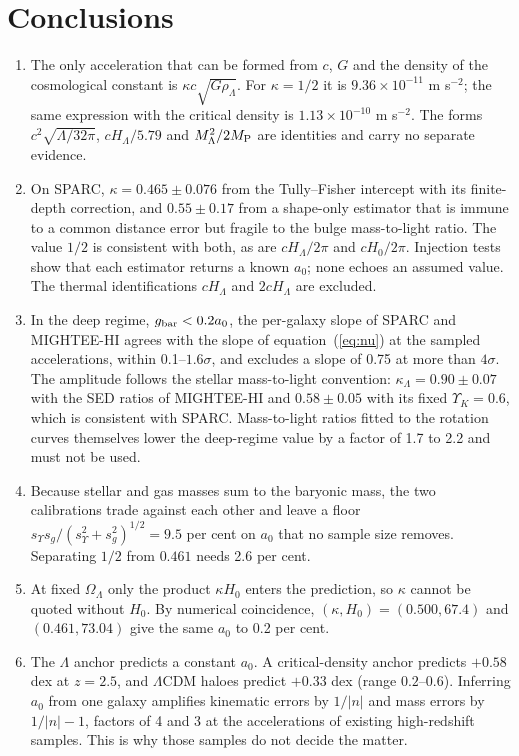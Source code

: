 \documentclass[fleqn,usenatbib]{mnras}
\begin{document}
\section{Conclusions}
\label{sec:conc}
\begin{enumerate}
\item The only acceleration that can be formed from $c$, $G$ and the density of the cosmological constant is $\kappa c\sqrt{G\rho_\Lambda}$. For $\kappa=1/2$ it is $9.36\times10^{-11}$ m s$^{-2}$; the same expression with the critical density is $1.13\times10^{-10}$ m s$^{-2}$. The forms $c^2\sqrt{\Lambda/32\pi}$, $cH_\Lambda/5.79$ and $M_\Lambda^2/2M_{\rm P}$ are identities and carry no separate evidence.
\item On SPARC, $\kappa=0.465\pm0.076$ from the Tully--Fisher intercept with its finite-depth correction, and $0.55\pm0.17$ from a shape-only estimator that is immune to a common distance error but fragile to the bulge mass-to-light ratio. The value $1/2$ is consistent with both, as are $cH_\Lambda/2\pi$ and $cH_0/2\pi$. Injection tests show that each estimator returns a known $a_0$; none echoes an assumed value. The thermal identifications $cH_\Lambda$ and $2cH_\Lambda$ are excluded.
\item In the deep regime, $g_{\rm bar}<0.2a_0$, the per-galaxy slope of SPARC and MIGHTEE-HI agrees with the slope of equation~(\ref{eq:nu}) at the sampled accelerations, within 0.1--$1.6\sigma$, and excludes a slope of 0.75 at more than $4\sigma$. The amplitude follows the stellar mass-to-light convention: $\kappa_\Lambda=0.90\pm0.07$ with the SED ratios of MIGHTEE-HI and $0.58\pm0.05$ with its fixed $\Upsilon_K=0.6$, which is consistent with SPARC. Mass-to-light ratios fitted to the rotation curves themselves lower the deep-regime value by a factor of 1.7 to 2.2 and must not be used.
\item Because stellar and gas masses sum to the baryonic mass, the two calibrations trade against each other and leave a floor $s_\Upsilon s_g/(s_\Upsilon^2+s_g^2)^{1/2}=9.5$ per cent on $a_0$ that no sample size removes. Separating $1/2$ from $0.461$ needs 2.6 per cent.
\item At fixed $\Omega_\Lambda$ only the product $\kappa H_0$ enters the prediction, so $\kappa$ cannot be quoted without $H_0$. By numerical coincidence, $(\kappa,H_0)=(0.500,67.4)$ and $(0.461,73.04)$ give the same $a_0$ to 0.2 per cent.
\item The $\Lambda$ anchor predicts a constant $a_0$. A critical-density anchor predicts $+0.58$ dex at $z=2.5$, and $\Lambda$CDM haloes predict $+0.33$ dex (range $0.2$--$0.6$). Inferring $a_0$ from one galaxy amplifies kinematic errors by $1/|n|$ and mass errors by $1/|n|-1$, factors of 4 and 3 at the accelerations of existing high-redshift samples. This is why those samples do not decide the matter.

\end{enumerate}
\end{document}
